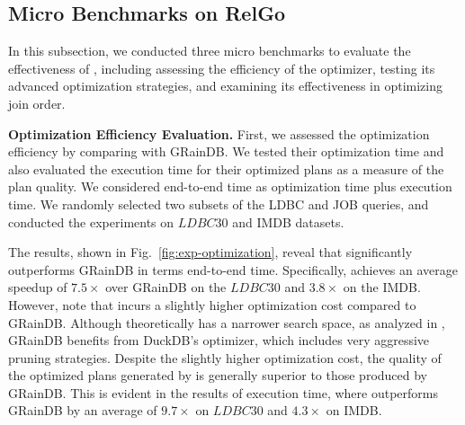 
\subsection{Micro Benchmarks on RelGo}
\label{sec:experiment-opt}
In this subsection, we conducted three micro benchmarks to evaluate the effectiveness of \name,
including assessing the efficiency of the optimizer, testing its advanced optimization strategies, and examining its effectiveness in optimizing join order.

\noindent\textbf{Optimization Efficiency Evaluation.}
First, we assessed the optimization efficiency by comparing \name with GRainDB\cite{graindb}.
We tested their optimization time
and also evaluated the execution time for their optimized plans as a measure of the plan quality.
We considered end-to-end time as optimization time plus execution time.
We randomly selected two subsets of the LDBC and JOB queries, and conducted the experiments on $LDBC30$ and IMDB datasets. %

The results, shown in Fig.~\ref{fig:exp-optimization}, reveal that \name significantly outperforms GRainDB in terms end-to-end time.
Specifically, \name achieves an average speedup of $7.5\times$ over GRainDB on the $LDBC30$ and $3.8\times$ on the IMDB.
However, note that \name incurs a slightly higher optimization cost compared to GRainDB. Although \name theoretically has a narrower search space, as analyzed in , GRainDB benefits from DuckDB's optimizer, which includes very aggressive pruning strategies.
Despite the slightly higher optimization cost, the quality of the optimized plans generated by \name is generally superior to those produced by GRainDB. This is evident in the results of execution time, where \name outperforms GRainDB by an average of $9.7\times$ on $LDBC30$ and $4.3\times$ on IMDB. %

